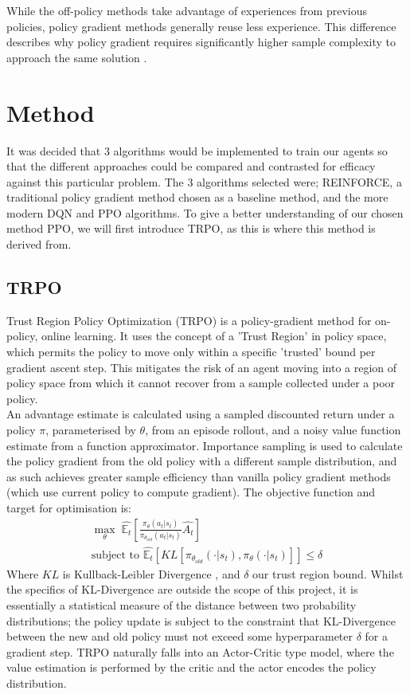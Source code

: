 \documentclass{article}
\begin{document}
While the off-policy methods take advantage of experiences from previous policies, policy gradient methods generally reuse less experience. This difference describes why policy gradient requires significantly higher sample complexity to approach the same solution \citep{Gadgil2020}.

\section{Method}
It was decided that 3 algorithms would be implemented to train our agents so that the different approaches could be compared and contrasted for efficacy against this particular problem. The 3 algorithms selected were; REINFORCE, a traditional policy gradient method chosen as a baseline method, and the more modern DQN and PPO algorithms. To give a better understanding of our chosen method PPO, we will first introduce TRPO, as this is where this method is derived from. 

\subsection{TRPO}
Trust Region Policy Optimization (TRPO) \citep{pmlr-v37-schulman15} is a policy-gradient method for on-policy, online learning. It uses the concept of a 'Trust Region' in policy space, which permits the policy to move only within a specific 'trusted' bound per gradient ascent step. This mitigates the risk of an agent moving into a region of policy space from which it cannot recover from a sample collected under a poor policy. \\\newline
An advantage estimate is calculated using a sampled discounted return under a policy $\pi$, parameterised by $\theta$, from an episode rollout, and a noisy value function estimate from a function approximator. Importance sampling is used to calculate the policy gradient from the old policy with a different sample distribution, and as such achieves greater sample efficiency than vanilla policy gradient methods (which use current policy to compute gradient). The objective function and target for optimisation is:
\begin{gather}
    \max_\theta\; \hat{\mathbb{E}_t}\left[\frac{\pi_\theta(a_t | s_t)}{\pi_{\theta_{old}}(a_t | s_t)}\hat{A_t}\right]\\
\text{subject to } \hat{\mathbb{E}_t}\left[KL\left[\pi_{\theta_{old}}(\cdot | s_t),\pi_\theta(\cdot|s_t)\right]\right] \leq \delta
\end{gather}
Where $KL$ is Kullback-Leibler Divergence \citep{Joyce2011}, and $\delta$ our trust region bound. Whilst the specifics of KL-Divergence are outside the scope of this project, it is essentially a statistical measure of the distance between two probability distributions; the policy update is subject to the constraint that KL-Divergence between the new and old policy must not exceed some hyperparameter $\delta$ for a gradient step. TRPO naturally falls into an Actor-Critic type model, where the value estimation is performed by the critic and the actor encodes the policy distribution. 
\end{document}
